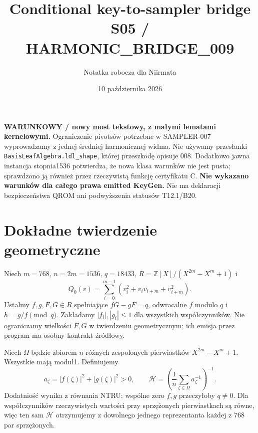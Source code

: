 \documentclass[11pt,a4paper]{article}
\title{Conditional key-to-sampler bridge\\\large S05 / HARMONIC\_BRIDGE\_009}
\author{Notatka robocza dla Niirmata}\date{10 października 2026}
\newcommand{\code}[1]{\nolinkurl{#1}}
\newcommand{\Z}{\mathbb Z}\newcommand{\C}{\mathbb C}
\newcommand{\HH}{\mathcal H}\newtheorem{theorem}{Twierdzenie}
\begin{document}
\maketitle
\textbf{WARUNKOWY / nowy most tekstowy, z małymi lematami kernelowymi.}
Ograniczenie pivotsów potrzebne w SAMPLER-007 wyprowadzamy z jednej
średniej harmonicznej widma. Nie używamy przesłanki
\code{BasisLeafAlgebra.ldl_shape}, której przeszkodę opisuje 008.
Dodatkowo jawna instancja stopnia1536 potwierdza, że nowa klasa warunków
nie jest pusta; sprawdzono ją również przez rzeczywistą funkcję certyfikatu C.
\textbf{Nie wykazano warunków dla całego prawa emitted KeyGen.}
Nie ma deklaracji bezpieczeństwa QROM ani podwyższenia statusów T12.1/B20.

\section{Dokładne twierdzenie geometryczne}
Niech $m=768$, $n=2m=1536$, $q=18433$,
$R=\Z[X]/(X^{2m}-X^m+1)$ i
\[
 Q_0(v)=\sum_{i=0}^{m-1}(v_i^2+v_iv_{i+m}+v_{i+m}^2).
\]
Ustalmy $f,g,F,G\in R$ spełniające $fG-gF=q$, odwracalne $f$ modulo $q$
i $h=g/f\pmod q$. Zakładamy $|f_i|,|g_i|\le1$ dla wszystkich
współczynników. Nie ograniczamy wielkości $F,G$ w twierdzeniu geometrycznym;
ich emisja przez program ma osobny kontrakt źródłowy.

Niech $\Omega$ będzie zbiorem $n$ różnych zespolonych pierwiastków
$X^{2m}-X^m+1$. Wszystkie mają moduł1. Definiujemy
\[
 a_\zeta=|f(\zeta)|^2+|g(\zeta)|^2>0,\qquad
 \HH=\left(\frac1n\sum_{\zeta\in\Omega}a_\zeta^{-1}\right)^{-1}.
\]
Dodatniość wynika z równania NTRU: wspólne zero $f,g$ przeczyłoby $q\ne0$.
Dla współczynników rzeczywistych wartości przy sprzężonych pierwiastkach
są równe, więc ten sam $\HH$ otrzymujemy z dowolnego jednego reprezentanta
każdej z 768 par sprzężonych.
\end{document}
